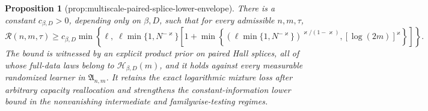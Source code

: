 \documentclass{article}
\newtheorem{proposition}{Proposition}
\begin{document}
\begin{proposition}[prop:multiscale-paired-splice-lower-envelope]\label{prop:multiscale-paired-splice-lower-envelope}
There is a constant \(c_{\beta,D}>0\), depending only on \(\beta,D\), such that for every admissible \(n,m,\tau\),
\[
\mathcal R(n,m,\tau)\ge c_{\beta,D}\min\!\left\{\ell,\;
\ell\min\{1,N^{-\varkappa}\}
\left[1+\min\!\left\{
\left(\ell\min\{1,N^{-\varkappa}\}\right)^{\varkappa/(1-\varkappa)},
[\log(2m)]^{\varkappa}
\right\}\right]\right\}.                                      \tag{21}
\]
The bound is witnessed by an explicit product prior on paired Hall splices, all of whose full-data laws belong to \(\mathcal H_{\beta,D}(m)\), and it holds against every measurable randomized learner in \(\mathfrak A_{n,m}\).  It retains the exact logarithmic mixture loss after arbitrary capacity reallocation and strengthens the constant-information lower bound in the nonvanishing intermediate and familywise-testing regimes.
\end{proposition}
\end{document}
